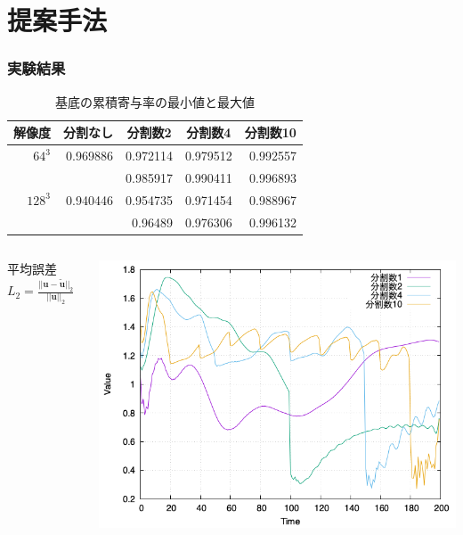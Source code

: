 \documentclass[aspectratio=169,dvipdfmx,hyperref={bookmarks=true}]{beamer}
\begin{document}
\section{提案手法}
\begin{frame}
\frametitle{実験結果}
\begin {table}[htbp]
    \centering
  \caption{基底の累積寄与率の最小値と最大値}
  \label{tab:ruiseki}
  \begin {tabular}{rrrrr} \hline
    \multicolumn{1}{c}{解像度} 					&\multicolumn{1}{c}{分割なし} 		&\multicolumn{1}{c}{分割数2}			&\multicolumn{1}{c}{分割数4} 		&\multicolumn{1}{c}{分割数10}\\ \hline
    $64^3$ 									& 0.969886					& 0.972114						&0.979512	 				&0.992557				\\
    										&							&0.985917						&0.990411					&0.996893				\\ \hline
    $128^3$ 								&0.940446 					&0.954735						&0.971454	 				&0.988967				\\ 
    										&							&0.96489							&0.976306					&0.996132				\\	\hline
  \end {tabular}
\end {table}
\begin{columns}[T]
	\begin{column}{0.4\linewidth}
	\begin{block}{}
	平均誤差$L_2 = \frac{|| \bm{u} - \bm{\widetilde{u}} ||_2}{||  \bm{u} ||_2}$
	\end{block}
    	\end{column}
	\begin{column}{0.6\linewidth}
		\includegraphics[width=0.7\linewidth]{images/128error.png}
	   \end{column}
    \end{columns}


 \end{frame}
\end{document}
